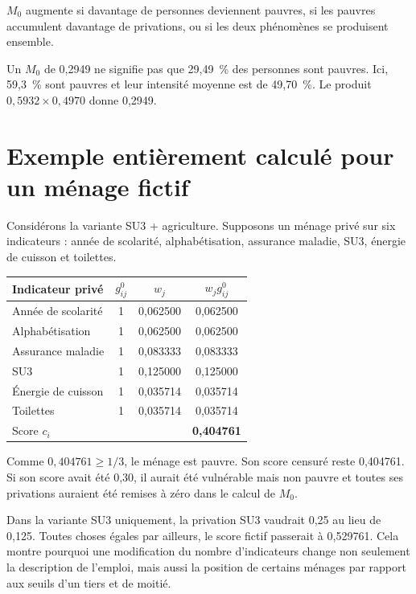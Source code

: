 \documentclass[11pt,a4paper]{article}
\begin{document}
$M_0$ augmente si davantage de personnes deviennent pauvres, si les pauvres accumulent davantage
de privations, ou si les deux phénomènes se produisent ensemble.

\begin{attention}
Un $M_0$ de 0,2949 ne signifie pas que 29,49~\% des personnes sont pauvres. Ici, 59,3~\% sont
pauvres et leur intensité moyenne est de 49,70~\%. Le produit $0,5932\times0,4970$ donne 0,2949.
\end{attention}

\section{Exemple entièrement calculé pour un ménage fictif}

Considérons la variante SU3 + agriculture. Supposons un ménage privé sur six indicateurs : année
de scolarité, alphabétisation, assurance maladie, SU3, énergie de cuisson et toilettes.

\begin{center}
\small
\begin{tabular}{@{}lccc@{}}
\toprule
\textbf{Indicateur privé} & $g^0_{ij}$ & $w_j$ & $w_jg^0_{ij}$ \\
\midrule
Année de scolarité & 1 & 0,062500 & 0,062500 \\
Alphabétisation & 1 & 0,062500 & 0,062500 \\
Assurance maladie & 1 & 0,083333 & 0,083333 \\
SU3 & 1 & 0,125000 & 0,125000 \\
Énergie de cuisson & 1 & 0,035714 & 0,035714 \\
Toilettes & 1 & 0,035714 & 0,035714 \\
\midrule
Score $c_i$ & & & \textbf{0,404761} \\
\bottomrule
\end{tabular}
\end{center}

Comme $0,404761 \geq 1/3$, le ménage est pauvre. Son score censuré reste 0,404761. Si son score
avait été 0,30, il aurait été vulnérable mais non pauvre et toutes ses privations auraient été
remises à zéro dans le calcul de $M_0$.

Dans la variante SU3 uniquement, la privation SU3 vaudrait 0,25 au lieu de 0,125. Toutes choses
égales par ailleurs, le score fictif passerait à 0,529761. Cela montre pourquoi une modification
du nombre d'indicateurs change non seulement la description de l'emploi, mais aussi la position de
certains ménages par rapport aux seuils d'un tiers et de moitié.
\end{document}

